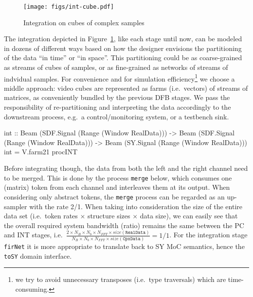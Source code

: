 \documentclass[
  a4paper,
]{article}
\newenvironment{Shaded}{}{}
\newcommand{\DataTypeTok}[1]{\textcolor[rgb]{0.56,0.13,0.00}{#1}}
\newcommand{\FunctionTok}[1]{\textcolor[rgb]{0.02,0.16,0.49}{#1}}
\newcommand{\NormalTok}[1]{#1}
\newcommand{\OtherTok}[1]{\textcolor[rgb]{0.00,0.44,0.13}{#1}}
\begin{document}
\begin{figure}
\hypertarget{fig:int-cube-atom}{%
\centering
\texttt{[image: figs/int-cube.pdf]}
\caption{Integration on cubes of complex
samples}\label{fig:int-cube-atom}
}
\end{figure}

The integration depicted in Figure~\ref{fig:int-cube-atom}, like each
stage until now, can be modeled in dozens of different ways based on how
the designer envisions the partitioning of the data ``in time'' or ``in
space''. This partitioning could be as coarse-grained as streams of
cubes of samples, or as fine-grained as networks of streams of indvidual
samples. For convenience and for simulation efficiency\footnote{we try
  to avoid unnecessary transposes (i.e.~type traversals) which are
  time-consuming.} we choose a middle approach: video cubes are
represented as farms (i.e.~vectors) of streams of matrices, as
conveniently bundled by the previous DFB stages. We pass the
responsibility of re-partitioning and interpreting the data accordingly
to the downstream process, e.g.~a control/monitoring system, or a
testbench sink.

\begin{Shaded}
\begin{Highlighting}[numbers=left,,firstnumber=573,]
\OtherTok{int ::} \DataTypeTok{Beam}\NormalTok{ (}\DataTypeTok{SDF.Signal}\NormalTok{ (}\DataTypeTok{Range}\NormalTok{ (}\DataTypeTok{Window} \DataTypeTok{RealData}\NormalTok{)))}
    \OtherTok{->} \DataTypeTok{Beam}\NormalTok{ (}\DataTypeTok{SDF.Signal}\NormalTok{ (}\DataTypeTok{Range}\NormalTok{ (}\DataTypeTok{Window} \DataTypeTok{RealData}\NormalTok{)))}
    \OtherTok{->} \DataTypeTok{Beam}\NormalTok{ (}\DataTypeTok{SY.Signal}\NormalTok{  (}\DataTypeTok{Range}\NormalTok{ (}\DataTypeTok{Window} \DataTypeTok{RealData}\NormalTok{)))}
\NormalTok{int }\FunctionTok{=}\NormalTok{ V.farm21 procINT}
\end{Highlighting}
\end{Shaded}

Before integrating though, the data from both the left and the right
channel need to be merged. This is done by the process \texttt{merge}
below, which consumes one (matrix) token from each channel and
interleaves them at its output. When considering only abstract tokens,
the \texttt{merge} process can be regarded as an up-sampler with the
rate 2/1. When taking into consideration the size of the entire data set
(i.e.~token rates \(\times\) structure sizes \(\times\) data size), we
can easily see that the overall required system bandwidth (ratio)
remains the same between the PC and INT stages,
i.e.~\(\frac{2\times N_B \times N_{b} \times N_{FFT}\times \mathit{size}(\mathtt{RealData})}{N_B \times N_{b} \times N_{FFT}\times \mathit{size}(\mathtt{CpxData})}=1/1\).
For the integration stage \texttt{firNet} it is more appropriate to
translate back to SY MoC semantics, hence the \texttt{toSY} domain
interface.
\end{document}

